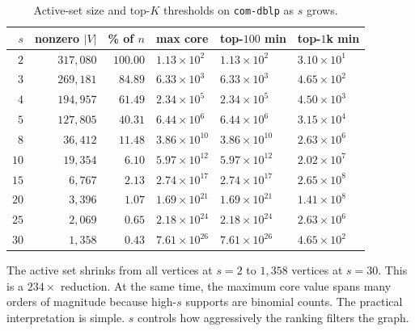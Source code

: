 \begin{table}[t]
\centering
\caption{Active-set size and top-\(K\) thresholds on \texttt{com-dblp} as \(s\) grows.}
\label{tab:cs1}
\small
\setlength{\tabcolsep}{4pt}
\begin{tabular}{r r r l l l}
\toprule
\(s\) & nonzero \(|V|\) & \% of \(n\) & max core & top-\(100\) min & top-\(1\)k min \\
\midrule
\(2\)  & \(317{,}080\) & \(100.00\) & \(1.13\!\times\!10^{2}\)  & \(1.13\!\times\!10^{2}\)  & \(3.10\!\times\!10^{1}\)  \\
\(3\)  & \(269{,}181\) & \(84.89\)  & \(6.33\!\times\!10^{3}\)  & \(6.33\!\times\!10^{3}\)  & \(4.65\!\times\!10^{2}\)  \\
\(4\)  & \(194{,}957\) & \(61.49\)  & \(2.34\!\times\!10^{5}\)  & \(2.34\!\times\!10^{5}\)  & \(4.50\!\times\!10^{3}\)  \\
\(5\)  & \(127{,}805\) & \(40.31\)  & \(6.44\!\times\!10^{6}\)  & \(6.44\!\times\!10^{6}\)  & \(3.15\!\times\!10^{4}\)  \\
\(8\)  & \(36{,}412\)  & \(11.48\)  & \(3.86\!\times\!10^{10}\) & \(3.86\!\times\!10^{10}\) & \(2.63\!\times\!10^{6}\)  \\
\(10\) & \(19{,}354\)  & \(6.10\)   & \(5.97\!\times\!10^{12}\) & \(5.97\!\times\!10^{12}\) & \(2.02\!\times\!10^{7}\)  \\
\(15\) & \(6{,}767\)   & \(2.13\)   & \(2.74\!\times\!10^{17}\) & \(2.74\!\times\!10^{17}\) & \(2.65\!\times\!10^{8}\)  \\
\(20\) & \(3{,}396\)   & \(1.07\)   & \(1.69\!\times\!10^{21}\) & \(1.69\!\times\!10^{21}\) & \(1.41\!\times\!10^{8}\)  \\
\(25\) & \(2{,}069\)   & \(0.65\)   & \(2.18\!\times\!10^{24}\) & \(2.18\!\times\!10^{24}\) & \(2.63\!\times\!10^{6}\)  \\
\(30\) & \(1{,}358\)   & \(0.43\)   & \(7.61\!\times\!10^{26}\) & \(7.61\!\times\!10^{26}\) & \(4.65\!\times\!10^{2}\)  \\
\bottomrule
\end{tabular}
\end{table}

The active set shrinks from all vertices at \(s=2\) to \(1{,}358\) vertices at \(s=30\).
%
This is a \(234\times\) reduction.
%
At the same time, the maximum core value spans many orders of magnitude because high-\(s\) supports are binomial counts.
%
The practical interpretation is simple.
%
\(s\) controls how aggressively the ranking filters the graph.

